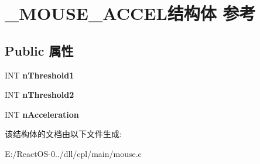 \hypertarget{struct___m_o_u_s_e___a_c_c_e_l}{}\section{\+\_\+\+M\+O\+U\+S\+E\+\_\+\+A\+C\+C\+E\+L结构体 参考}
\label{struct___m_o_u_s_e___a_c_c_e_l}
\subsection*{Public 属性}
\begin{DoxyCompactItemize}
\item 
\mbox{\label{struct___m_o_u_s_e___a_c_c_e_l_a84ba4913cf3f85424362cfaeb51cbe0d}} 
I\+NT {\bfseries n\+Threshold1}
\item 
\mbox{\label{struct___m_o_u_s_e___a_c_c_e_l_aeabb07bfecfb6bacdc0d9087c93d3a82}} 
I\+NT {\bfseries n\+Threshold2}
\item 
\mbox{\label{struct___m_o_u_s_e___a_c_c_e_l_a9d52a3bb05492a08fbf080e8fc78d638}} 
I\+NT {\bfseries n\+Acceleration}
\end{DoxyCompactItemize}


该结构体的文档由以下文件生成\+:\begin{DoxyCompactItemize}
\item 
E\+:/\+React\+O\+S-\/0../dll/cpl/main/mouse.\+c\end{DoxyCompactItemize}
